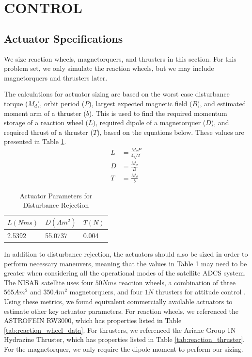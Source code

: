 \section{\Large CONTROL}
\subsection{Actuator Specifications}
We size reaction wheels, magnetorquers, and thrusters in this section. For this problem set, we only simulate the reaction wheels, but we may include magnetorquers and thrusters later.

The calculations for actuator sizing are based on the worst case disturbance torque ($M_d$), orbit period ($P$), largest expected magnetic field ($B$), and estimated moment arm of a thruster ($b$). This is used to find the required momentum storage of a reaction wheel ($L$), required dipole of a magnetorquer ($D$), and required thrust of a thruster ($T$), based on the equations below. These values are presented in Table \ref{tab:estimate_actuator_sizing}.
\begin{align*}
    L &= \frac{M_d P}{4 \sqrt{2}} \\
    D &= \frac{M_d}{B} \\
    T &= \frac{M_d}{b}
\end{align*}
\vspace{-2em}
\begin{table}[H]
\centering
\caption{Actuator Parameters for Disturbance Rejection}
\label{tab:estimate_actuator_sizing}
\begin{tabular}{|l|l|l|}
\hline
$L (N m s)$ & $D (A m^2)$ & $T (N)$    \\ \hline
2.5392    & 55.0737   & 0.004        \\ \hline
\end{tabular}
\end{table}

In addition to disturbance rejection, the actuators should also be sized in order to perform necessary maneuvers, meaning that the values in Table \ref{tab:estimate_actuator_sizing} may need to be greater when considering all the operational modes of the satellite ADCS system. The NISAR satellite uses four $50 N m s$ reaction wheels, a combination of three $565 A m^2$ and $350 A m^2$ magnetorquers, and four $1 N$ thrusters for attitude control \cite{NISARMission}. Using these metrics, we found equivalent commercially available actuators to estimate other key actuator parameters. For reaction wheels, we referenced the ASTROFEIN RW3000, which has properties listed in Table \ref{tab:reaction_wheel_data}. For thrusters, we referenced the Ariane Group 1N Hydrazine Thruster, which has properties listed in Table \ref{tab:reaction_thruster}. For the magnetorquer, we only require the dipole moment to perform our sizing.

